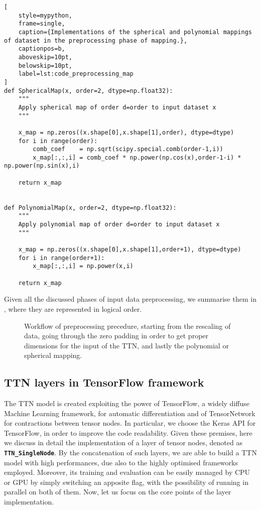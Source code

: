 \documentclass[../main/main.tex]{subfiles}
\begin{document}
\begin{lstlisting}[
    style=mypython,
    frame=single,
    caption={Implementations of the spherical and polynomial mappings of dataset in the preprocessing phase of mapping.},
    captionpos=b,
    aboveskip=10pt,
    belowskip=10pt,
    label=lst:code_preprocessing_map
]
def SphericalMap(x, order=2, dtype=np.float32):
    """
    Apply spherical map of order d=order to input dataset x
    """
    
    x_map = np.zeros((x.shape[0],x.shape[1],order), dtype=dtype)
    for i in range(order):
        comb_coef    = np.sqrt(scipy.special.comb(order-1,i))
        x_map[:,:,i] = comb_coef * np.power(np.cos(x),order-1-i) * np.power(np.sin(x),i)
    
    return x_map


def PolynomialMap(x, order=2, dtype=np.float32):
    """
    Apply polynomial map of order d=order to input dataset x
    """
    
    x_map = np.zeros((x.shape[0],x.shape[1],order+1), dtype=dtype)
    for i in range(order+1):
        x_map[:,:,i] = np.power(x,i)
    
    return x_map
\end{lstlisting}


Given all the discussed phases of input data preprocessing, we summarise them in , where they are represented in logical order.

\begin{figure*}[!h]
    \centering
    
    \caption{Workflow of preprocessing precedure, starting from the rescaling of data, going through the zero padding in order to get proper dimensions for the input of the TTN, and lastly the polynomial or spherical mapping.}
    \label{fig:code_preprocessing_workflow}
\end{figure*}



\subsection{TTN layers in TensorFlow framework}
\label{ssec:code_layer}
The TTN model is created exploiting the power of TensorFlow, a widely diffuse Machine Learning framework, for automatic differentiation and of TensorNetwork for contractions between tensor nodes.
In particular, we choose the Keras API for TensorFlow, in order to improve the code readability. Given these premises, here we discuss in detail the implementation of a layer of tensor nodes, denoted as \texttt{\bfseries TTN\_SingleNode}. By the concatenation of such layers, we are able to build a TTN model with high performances, due also to the highly optimised frameworks employed. Moreover, its training and evaluation can be easily managed by CPU or GPU by simply switching an apposite flag, with the possibility of running in parallel on both of them. Now, let us focus on the core points of the layer implementation.
\end{document}
